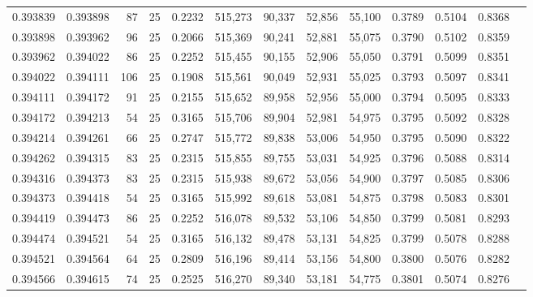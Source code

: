 \begin{tabular}{rrrrrrrrrrrrr}
0.393839 & 0.393898 &    87 &  25 &                                     0.2232 & 515,273 &  90,337 &  52,856 &  55,100 & 0.3789 & 0.5104 & 0.8368 \\
0.393898 & 0.393962 &    96 &  25 &                                     0.2066 & 515,369 &  90,241 &  52,881 &  55,075 & 0.3790 & 0.5102 & 0.8359 \\
0.393962 & 0.394022 &    86 &  25 &                                     0.2252 & 515,455 &  90,155 &  52,906 &  55,050 & 0.3791 & 0.5099 & 0.8351 \\
0.394022 & 0.394111 &   106 &  25 &                                     0.1908 & 515,561 &  90,049 &  52,931 &  55,025 & 0.3793 & 0.5097 & 0.8341 \\
0.394111 & 0.394172 &    91 &  25 &                                     0.2155 & 515,652 &  89,958 &  52,956 &  55,000 & 0.3794 & 0.5095 & 0.8333 \\
0.394172 & 0.394213 &    54 &  25 &                                     0.3165 & 515,706 &  89,904 &  52,981 &  54,975 & 0.3795 & 0.5092 & 0.8328 \\
0.394214 & 0.394261 &    66 &  25 &                                     0.2747 & 515,772 &  89,838 &  53,006 &  54,950 & 0.3795 & 0.5090 & 0.8322 \\
0.394262 & 0.394315 &    83 &  25 &                                     0.2315 & 515,855 &  89,755 &  53,031 &  54,925 & 0.3796 & 0.5088 & 0.8314 \\
0.394316 & 0.394373 &    83 &  25 &                                     0.2315 & 515,938 &  89,672 &  53,056 &  54,900 & 0.3797 & 0.5085 & 0.8306 \\
0.394373 & 0.394418 &    54 &  25 &                                     0.3165 & 515,992 &  89,618 &  53,081 &  54,875 & 0.3798 & 0.5083 & 0.8301 \\
0.394419 & 0.394473 &    86 &  25 &                                     0.2252 & 516,078 &  89,532 &  53,106 &  54,850 & 0.3799 & 0.5081 & 0.8293 \\
0.394474 & 0.394521 &    54 &  25 &                                     0.3165 & 516,132 &  89,478 &  53,131 &  54,825 & 0.3799 & 0.5078 & 0.8288 \\
0.394521 & 0.394564 &    64 &  25 &                                     0.2809 & 516,196 &  89,414 &  53,156 &  54,800 & 0.3800 & 0.5076 & 0.8282 \\
0.394566 & 0.394615 &    74 &  25 &                                     0.2525 & 516,270 &  89,340 &  53,181 &  54,775 & 0.3801 & 0.5074 & 0.8276 \\

\end{tabular}
